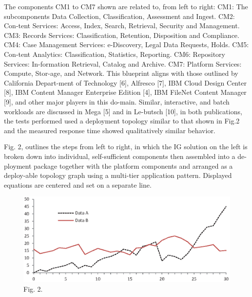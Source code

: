 \documentclass[runningheads]{llncs}
\begin{document}
The components CM1 to CM7 shown are related to, from left to right: CM1: The subcomponents Data Collection, Classification, Assessment and Ingest. CM2: Con-tent Services: Access, Index, Search, Retrieval, Security and Management. CM3: Records Services: Classification, Retention, Disposition and Compliance. CM4: Case Management Services: e-Discovery, Legal Data Requests, Holds. CM5: Con-tent Analytics: Classification, Statistics, Reporting. CM6: Repository Services: In-formation Retrieval, Catalog and Archive.  CM7: Platform Services: Compute, Stor-age, and Network. This blueprint aligns with those outlined by California Depart-ment of Technology [6], Alfresco [7], IBM Cloud Design Center [8], IBM Content Manager Enterprise Edition [4], IBM FileNet Content Manager [9], and other major players in this do-main. 
Similar, interactive, and batch workloads are discussed in Mega [5] and in Le-butsch [10], in both publications, the tests performed used a deployment topology similar to that shown in Fig.2 and the measured response time showed qualitatively similar behavior.

Fig. 2, outlines the steps from left to right, in which the IG solution on the left is broken down into individual, self-sufficient components then assembled into a de-ployment package together with the platform components and arranged as a deploy-able topology graph using a multi-tier application pattern.
\noindent Displayed equations are centered and set on a separate line.

\begin{figure}
\includegraphics[width=\textwidth]{fig1.eps}
\caption{Fig. 2.} \label{fig2}
\end{figure}

\end{document}
